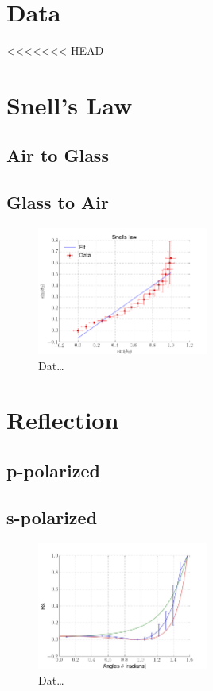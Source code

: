 \section{Data}
<<<<<<< HEAD
\section{Snell's Law}
\subsection{Air to Glass}

\subsection{Glass to Air}

\begin{figure}[h]
    \centering
    \includegraphics[width=0.5\textwidth]{snell}
    \caption{Dat\ldots}
    \label{fig:fit}
\end{figure}

\section{Reflection}
\subsection{p-polarized}
\subsection{s-polarized}
\begin{figure}[h]
    \centering
    \includegraphics[width=0.5\textwidth]{reflection}
    \caption{Dat\ldots}
    \label{fig:reflection}
\end{figure}



